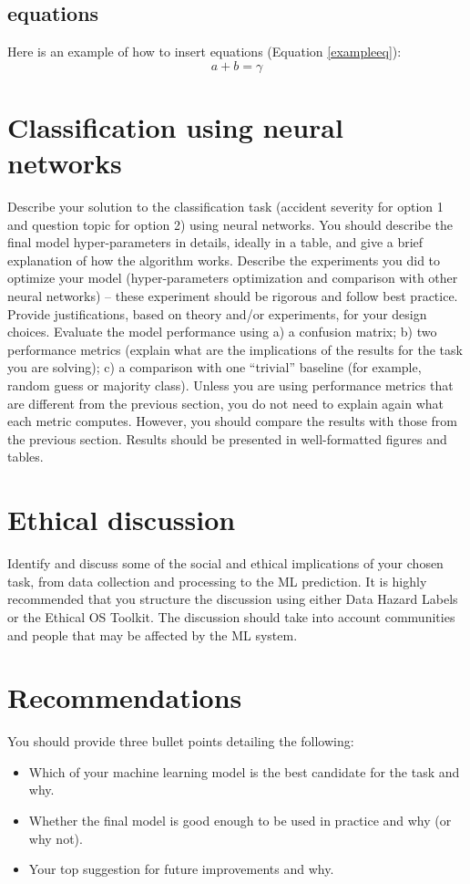 \documentclass[12pt, a4paper]{article}
\begin{document}
\subsection{equations}
Here is an example of how to insert equations (Equation \eqref{exampleeq}):
\begin{equation}
a+b=\gamma\label{eq}
\label{exampleeq}
\end{equation}

\section{Classification using neural networks}
Describe your solution to the classification task (accident severity for option 1 and question topic for option 2) using neural networks. You should describe the final model hyper-parameters in details, ideally in a table, and give a brief explanation of how the algorithm works. 
Describe the experiments you did to optimize your model (hyper-parameters optimization and comparison with other neural networks) – these experiment should be rigorous and follow best practice. Provide justifications, based on theory and/or experiments, for your design choices.
Evaluate the model performance using a) a confusion matrix; b) two performance metrics (explain what are the implications of the results for the task you are solving); c) a comparison with one “trivial” baseline (for example, random guess or majority class). Unless you are using performance metrics that are different from the previous section, you do not need to explain again what each metric computes. However, you should compare the results with those from the previous section.
Results should be presented in well-formatted figures and tables.

\section{Ethical discussion}
Identify and discuss some of the social and ethical implications of your chosen task, from data collection and processing to the ML prediction. It is highly recommended that you structure the discussion using either Data Hazard Labels or the Ethical OS Toolkit. The discussion should take into account communities and people that may be affected by the ML system.

\section{Recommendations}
You should provide three bullet points detailing the following:
\begin{itemize}
    \item Which of your machine learning model is the best candidate for the task and why. 
    \item Whether the final model is good enough to be used in practice and why (or why not).
    \item Your top suggestion for future improvements and why.
\end{itemize}
\end{document}
